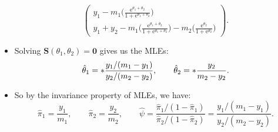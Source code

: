 \documentclass[oneside]{book}\usepackage[]{graphicx}\usepackage[svgnames]{xcolor}
\let\log\relax%
\providecommand{\Vector}[1]{\bm{#1}}%
\begin{document}
\begin{itemize}
\[\begin{pmatrix}
                        y_1-m_1\biggl(\frac{\mathrm{e}^{\theta_1+\theta_2}}{1+\mathrm{e}^{\theta_1+\theta_2}} \biggr) \\
                        y_1+y_2-m_1\biggl(\frac{\mathrm{e}^{\theta_1+\theta_2}}{1+\mathrm{e}^{\theta_1+\theta_2}} \biggr)-m_2\biggl(\frac{\mathrm{e}^{\theta_2}}{1+\mathrm{e}^{\theta_2}} \biggr)
                  \end{pmatrix}. \]
      \item Solving $ \Vector{S}(\theta_1,\theta_2)=\Vector{0} $ gives us the MLEs:
            \[ \hat{\theta}_1=\log*{\frac{y_1/(m_1-y_1)}{y_2/(m_2-y_2)}},\qquad \hat{\theta}_2=\log*{\frac{y_2}{m_2-y_2}}. \]
      \item So by the invariance property of MLEs, we have:
            \[ \hat{\pi}_1=\frac{y_1}{m_1},\qquad \hat{\pi}_2=\frac{y_2}{m_2},\qquad\hat{\psi}=\frac{\hat{\pi}_1/(1-\hat{\pi}_1)}{\hat{\pi}_2/(1-\hat{\pi}_2)}=\frac{y_1/(m_1-y_1)}{y_2/(m_2-y_2)}.  \]
\end{itemize}
\end{document}
